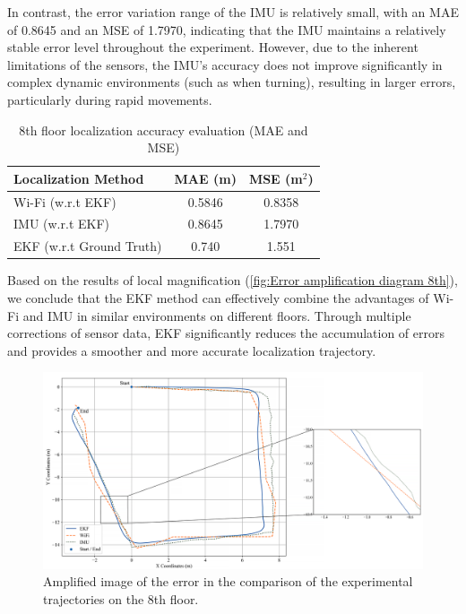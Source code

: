 \documentclass[12pt,a4paper]{article}
\numberwithin{equation}{section}
\begin{document}
In contrast, the error variation range of the IMU is relatively small, with an
MAE of 0.8645 and an MSE of 1.7970, indicating that the IMU maintains a
relatively stable error level throughout the experiment. However, due to the
inherent limitations of the sensors, the IMU's accuracy does not improve
significantly in complex dynamic environments (such as when turning), resulting
in larger errors, particularly during rapid movements.
\begin{table}[H]
  \caption{8th floor localization accuracy evaluation (MAE and MSE)}
  \label{tab:8thfloor_error}
  \centering
  \begin{tabular}{lcc}
    \toprule
    \textbf{Localization Method} & \textbf{MAE (m)} & \textbf{MSE (m$^2$)} \\
    \midrule
    Wi-Fi (w.r.t EKF) & 0.5846 & 0.8358 \\
    IMU (w.r.t EKF) & 0.8645 & 1.7970 \\
    EKF (w.r.t Ground Truth) & 0.740 & 1.551 \\
    \bottomrule
  \end{tabular}
\end{table}

Based on the results of local magnification (\autoref{fig:Error amplification
  diagram 8th}), we conclude that the EKF method can effectively combine the
advantages of Wi-Fi and IMU in similar environments on different floors. Through
multiple corrections of sensor data, EKF significantly reduces the accumulation
of errors and provides a smoother and more accurate localization trajectory.
\begin{figure}[H]
  \centering
  \includegraphics[width=1\linewidth]{Amplification images/wifi/half_circle.png}
  \caption{Amplified image of the error in the comparison of the experimental
    trajectories on the 8th floor.}
  \label{fig:Error amplification diagram 8th}
\end{figure}
\end{document}
